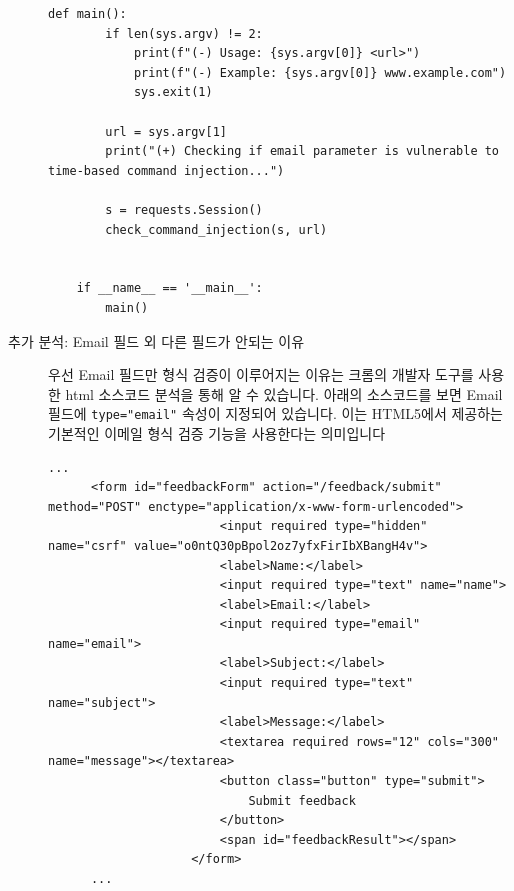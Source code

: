 \documentclass{article}
\begin{document}
\begin{description}
\begin{lstlisting}[label={lst:modified-request},caption={Python script for problem 2}, showspaces=false,showstringspaces=false]
    def main():
        if len(sys.argv) != 2:
            print(f"(-) Usage: {sys.argv[0]} <url>")
            print(f"(-) Example: {sys.argv[0]} www.example.com")
            sys.exit(1)

        url = sys.argv[1]
        print("(+) Checking if email parameter is vulnerable to time-based command injection...")

        s = requests.Session()
        check_command_injection(s, url)


    if __name__ == '__main__':
        main()
  \end{lstlisting}

    \newpage
    \item[추가 분석: Email 필드 외 다른 필드가 안되는 이유]\leavevmode\par
    우선 Email 필드만 형식 검증이 이루어지는 이유는 크롬의 개발자 도구를 사용한 html 소스코드 분석을 통해 알 수 있습니다. 아래의 소스코드를 보면 
    Email 필드에 \texttt{type="email"} 속성이 지정되어 있습니다. 이는 HTML5에서 제공하는 기본적인 이메일 형식 검증 기능을 사용한다는 의미입니다

    \begin{lstlisting}[label={lst:modified-request},caption={피드백 폼의 HTML 소스 코드}]
      ...
      <form id="feedbackForm" action="/feedback/submit" method="POST" enctype="application/x-www-form-urlencoded">
                        <input required type="hidden" name="csrf" value="o0ntQ30pBpol2oz7yfxFirIbXBangH4v">
                        <label>Name:</label>
                        <input required type="text" name="name">
                        <label>Email:</label>
                        <input required type="email" name="email">
                        <label>Subject:</label>
                        <input required type="text" name="subject">
                        <label>Message:</label>
                        <textarea required rows="12" cols="300" name="message"></textarea>
                        <button class="button" type="submit">
                            Submit feedback
                        </button>
                        <span id="feedbackResult"></span>
                    </form>
      ...
    \end{lstlisting}


\end{description}
\end{document}
